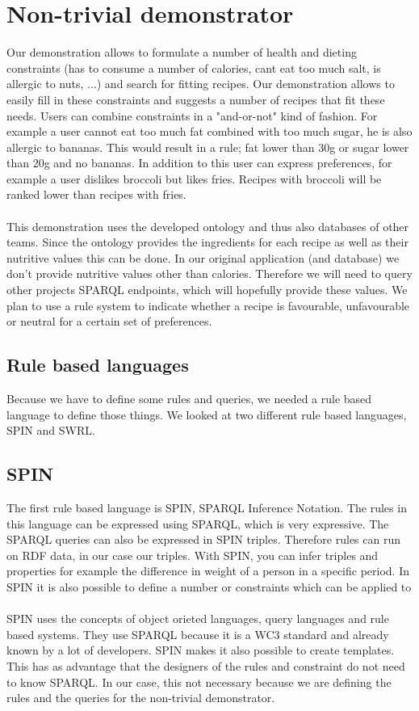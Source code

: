 \section{Non-trivial demonstrator}
Our demonstration allows to formulate a number of health and dieting constraints (has to consume a number of calories, cant eat too much salt, is allergic to nuts, ...) and search for fitting recipes. Our demonstration allows to easily fill in these constraints and suggests a number of recipes that fit these needs. Users can combine constraints in a "and-or-not" kind of fashion. For example a user cannot eat too much fat combined with too much sugar, he is also allergic to bananas. This would result in a rule; fat lower than 30g or sugar lower than 20g and no bananas. In addition to this user can express preferences, for example a user dislikes broccoli but likes fries. Recipes with broccoli will be ranked lower than recipes with fries.
\\ \\
This demonstration uses the developed ontology and thus also databases of other teams. Since the ontology provides the ingredients for each recipe as well as their nutritive values this can be done. In our original application (and database) we don't provide nutritive values other than calories. Therefore we will need to query other projects SPARQL endpoints, which will hopefully provide these values. We plan to use a rule system to indicate whether a recipe is favourable, unfavourable or neutral for a certain set of preferences.

\subsection{Rule based languages}
Because we have to define some rules and queries, we needed a rule based language to define those things. We looked at two different rule based languages, SPIN and SWRL.
\subsection*{SPIN}
The first rule based language is SPIN, SPARQL Inference Notation. The rules in this language can be expressed using SPARQL, which is very expressive. The SPARQL queries can also be expressed in SPIN triples. Therefore rules can run on RDF data, in our case our triples. With SPIN, you can infer triples and properties for example the difference in weight of a person in a specific period. In SPIN it is also possible to define a number or constraints which can be applied to 
\\ \\ 
SPIN uses the concepts of object orieted languages, query languages and rule based systems. They use SPARQL because it is a WC3 standard and already known by a lot of developers.
SPIN makes it also possible to create templates. This has as advantage that the designers of the rules and constraint do not need to know SPARQL. In our case, this not necessary because we are defining the rules and the queries for the non-trivial demonstrator. 

